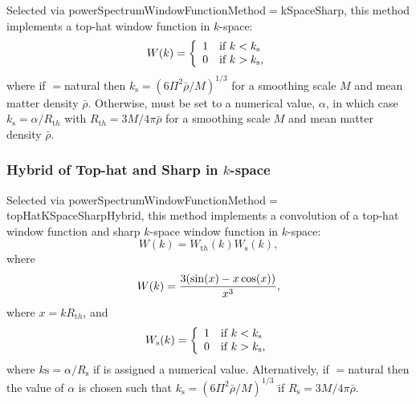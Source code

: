 Selected via {\normalfont \ttfamily powerSpectrumWindowFunctionMethod}$=${\normalfont \ttfamily kSpaceSharp}, this method implements a top-hat window function in $k$-space:
\begin{equation}
 W(k) = \left\{ \begin{array}{ll} 1 & \hbox{if } k < k_{\mathrm s} \\ 0 & \hbox{if } k > k_{\mathrm s}, \end{array} \right.
\end{equation}
where if {\normalfont \ttfamily [powerSpectrumWindowFunctionSharpKSpaceNormalization]}$=${\normalfont \ttfamily natural} then $k_{\mathrm s} = (6 \Pi^2 \bar{\rho} / M)^{1/3}$ for a smoothing scale $M$ and mean matter density $\bar{\rho}$. Otherwise, {\normalfont \ttfamily [powerSpectrumWindowFunctionSharpKSpaceNormalization]} must be set to a numerical value, $\alpha$, in which case $k_{\mathrm s} = \alpha / R_{\mathrm th}$ with $R_{\mathrm th}=3M/4\pi\bar{\rho}$ for a smoothing scale $M$ and mean matter density $\bar{\rho}$.

\subsubsection{Hybrid of Top-hat and Sharp in $k$-space}

Selected via {\normalfont \ttfamily powerSpectrumWindowFunctionMethod}$=${\normalfont \ttfamily topHatKSpaceSharpHybrid}, this method implements a convolution of a top-hat window function and sharp $k$-space window function in $k$-space:
\begin{equation}
 W(k) = W_{\mathrm th}(k) W_{\mathrm s}(k),
\end{equation}
where
\begin{equation}
 W(k) = {3 (\sin(x)-x \cos(x)) \over x^3},
\end{equation}
where $x = k R_{\mathrm th}$, and
\begin{equation}
 W_{\mathrm s}(k) = \left\{ \begin{array}{ll} 1 & \hbox{if } k < k_{\mathrm s} \\ 0 & \hbox{if } k > k_{\mathrm s}, \end{array} \right.
\end{equation}
where $k{\mathrm s} = \alpha / R_{\mathrm s}$ if {\normalfont \ttfamily [powerSpectrumWindowFunctionSharpKSpaceNormalization]} is assigned a numerical value. Alternatively, if {\normalfont \ttfamily [powerSpectrumWindowFunctionSharpKSpaceNormalization]}$=${\normalfont \ttfamily natural} then the value of $\alpha$ is chosen such that $k_{\mathrm s} = (6 \Pi^2 \bar{\rho}/M)^{1/3}$ if $R_{\mathrm s}=3M/4\pi\bar{\rho}$.

